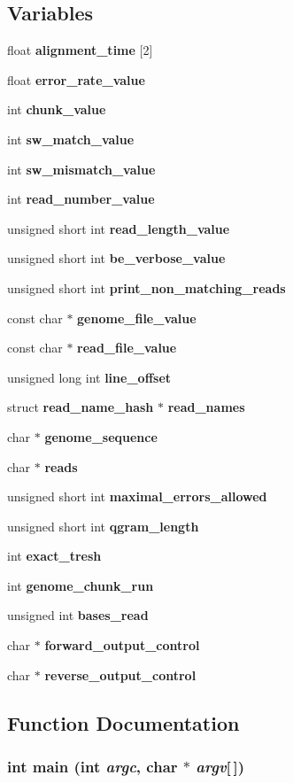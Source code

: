 \subsection*{Variables}
\begin{CompactItemize}
\item 
float {\bf alignment\_\-time} [2]
\item 
float {\bf error\_\-rate\_\-value}
\item 
int {\bf chunk\_\-value}
\item 
int {\bf sw\_\-match\_\-value}
\item 
int {\bf sw\_\-mismatch\_\-value}
\item 
int {\bf read\_\-number\_\-value}
\item 
unsigned short int {\bf read\_\-length\_\-value}
\item 
unsigned short int {\bf be\_\-verbose\_\-value}
\item 
unsigned short int {\bf print\_\-non\_\-matching\_\-reads}
\item 
const char $\ast$ {\bf genome\_\-file\_\-value}
\item 
const char $\ast$ {\bf read\_\-file\_\-value}
\item 
unsigned long int {\bf line\_\-offset}
\item 
struct {\bf read\_\-name\_\-hash} $\ast$ {\bf read\_\-names}
\item 
char $\ast$ {\bf genome\_\-sequence}
\item 
char $\ast$ {\bf reads}
\item 
unsigned short int {\bf maximal\_\-errors\_\-allowed}
\item 
unsigned short int {\bf qgram\_\-length}
\item 
int {\bf exact\_\-tresh}
\item 
int {\bf genome\_\-chunk\_\-run}
\item 
unsigned int {\bf bases\_\-read}
\item 
char $\ast$ {\bf forward\_\-output\_\-control}
\item 
char $\ast$ {\bf reverse\_\-output\_\-control}
\end{CompactItemize}


\subsection{Function Documentation}
\subsubsection[{main}]{\setlength{\rightskip}{0pt plus 5cm}int main (int {\em argc}, \/  char $\ast$ {\em argv}[$\,$])}\label{saruman_8h_0ddf1224851353fc92bfbff6f499fa97}


